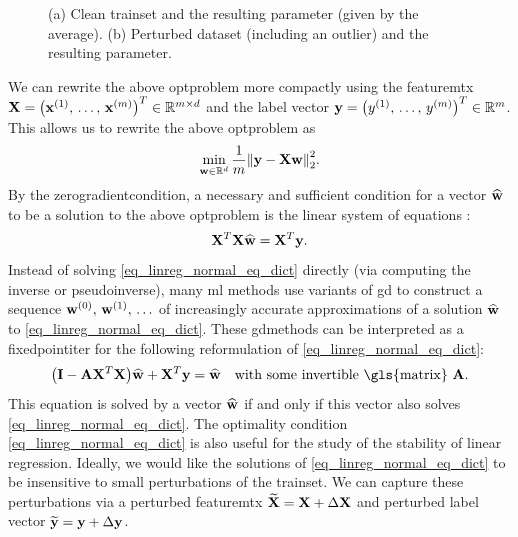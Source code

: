 {{\begin{figure}[H]
{			(a) Clean \gls{trainset} and the resulting \gls{parameter} (given by the average). 
		 	(b) Perturbed \gls{dataset} (including an \gls{outlier}) 
		 	and the resulting \gls{parameter}. \label{fig_linreg_dict}}
		\end{figure}
		We can rewrite the above \gls{optproblem} more compactly using the 
		\gls{featuremtx} ${\bf X} = \big({\bf x}^{(1)},\,\ldots,\,{\bf x}^{(m)}\big)^{T} \in \mathbb{R}^{m \times d}$ 
		and the \gls{label} \gls{vector} ${\bf y} = \big( y^{(1)},\,\ldots, \,y^{(m)} \big)^{T} \in \mathbb{R}^{m}$. 
		This allows us to rewrite the above \gls{optproblem} as
		$$\min_{\weights \in \mathbb{R}^{\nrfeatures}} \frac{1}{\samplesize} \normgeneric{\labelvec - \featuremtx \weights}{2}^{2}.$$
		By the \gls{zerogradientcondition}, a necessary and sufficient condition for a 
		\gls{vector} $\widehat{{\bf w}}$ to be a solution to the above \gls{optproblem} is the 
		linear system of equations \cite{StrangLinAlg2016}:
		\begin{equation} 
			\label{eq_linreg_normal_eq_dict}
			{\bf X}^{T}{\bf X} \widehat{{\bf w}} = {\bf X}^{T} {\bf y}.
		\end{equation}
		Instead of solving \eqref{eq_linreg_normal_eq_dict} directly 
		(via computing the \gls{inverse} or \gls{pseudoinverse}), 
		many \gls{ml} methods use variants of \gls{gd} to construct a \gls{sequence} 
		${\bf w}^{(0)},\,{\bf w}^{(1)},\,\ldots$ of increasingly accurate approximations 
		of a solution $\widehat{{\bf w}}$ to \eqref{eq_linreg_normal_eq_dict}. These 
		\glspl{gdmethod} can be interpreted as a \gls{fixedpointiter} for the following 
		reformulation of \eqref{eq_linreg_normal_eq_dict}:
		$$ \big(\mathbf{I} - \mA \featuremtx^{T}\featuremtx\big) \widehat{\weights} + \featuremtx^{T} 
		\labelvec = \widehat{\weights} \quad \mbox{with some invertible \gls{matrix} } \mA.$$
		This equation is solved by a \gls{vector} $\widehat{{\bf w}}$ if and only if 
		this \gls{vector} also solves \eqref{eq_linreg_normal_eq_dict}. The optimality 
		condition \eqref{eq_linreg_normal_eq_dict} is also useful for the study of 
		the \gls{stability} of linear \gls{regression}. Ideally, we would like the solutions of 
		\eqref{eq_linreg_normal_eq_dict} to be insensitive to small perturbations 
		of the \gls{trainset}. We can capture these perturbations via a 
		perturbed \gls{featuremtx} $\widetilde{{\bf X}} = {\bf X} + \Delta {\bf X}$
		and perturbed \gls{label} 
		\gls{vector} $\widetilde{{\bf y}} = {\bf y} + \Delta {\bf y}$. 
}}
